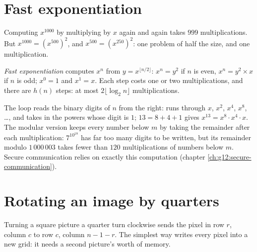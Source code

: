 \section{Fast exponentiation}\label{sec:g12:divide-and-conquer:power}

Computing $x^{1000}$ by multiplying by $x$ again and again takes $999$ multiplications. But $x^{1000} =
(x^{500})^2$, and $x^{500} = (x^{250})^2$: one problem of half the size, and one multiplication.

\begin{method}\label{met:g12:divide-and-conquer:fast-power}
\emph{Fast exponentiation} computes $x^n$ from $y = x^{\lfloor n/2 \rfloor}$: $x^n = y^2$
if $n$ is even, $x^n = y^2 \times x$ if $n$ is odd; $x^0 = 1$ and $x^1 = x$. Each step costs one or two
multiplications, and there are $h(n)$ steps: at most $2 \lfloor \log_2 n \rfloor$ multiplications.
\end{method}

\label{lst:g12:divide-and-conquer:power}

\label{out:g12:divide-and-conquer:power}

The loop reads the binary digits of $n$ from the right:  runs through $x$, $x^2$, $x^4$, $x^8$, \dots,
and  takes in the powers whose digit is $1$; $13 = 8 + 4 + 1$ gives $x^{13} = x^8 \cdot x^4 \cdot x$.
The modular version keeps every number below $m$ by taking the remainder after each multiplication: $7^{10^{18}}$ has
far too many digits to be written, but its remainder modulo $1\,000\,003$ takes fewer than $120$
multiplications of numbers below $m$. Secure
communication relies on exactly this computation (chapter \ref{ch:g12:secure-communication}).

\section{Rotating an image by quarters}\label{sec:g12:divide-and-conquer:rotate}

Turning a square picture a quarter turn clockwise sends the pixel in row $r$, column $c$ to row $c$, column
$n - 1 - r$. The simplest way writes every pixel into a new grid: it needs a second picture's worth of memory.

